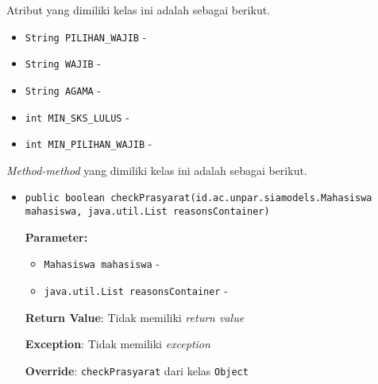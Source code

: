 \documentclass{article}
\begin{document}
\begin{enumerate}
Atribut yang dimiliki kelas ini adalah sebagai berikut.
\begin{itemize}
\item \texttt{String PILIHAN\_WAJIB} - 
\item \texttt{String WAJIB} - 
\item \texttt{String AGAMA} - 
\item \texttt{int MIN\_SKS\_LULUS} - 
\item \texttt{int MIN\_PILIHAN\_WAJIB} - 
\end{itemize}
\textit{Method-method} yang dimiliki kelas ini adalah sebagai berikut.
\begin{itemize}
\item \texttt{public boolean checkPrasyarat(id.ac.unpar.siamodels.Mahasiswa mahasiswa, java.util.List reasonsContainer)}



\textbf{Parameter:}
\begin{itemize}
\item \texttt{Mahasiswa mahasiswa} - 
\item \texttt{java.util.List reasonsContainer} - 
\end{itemize}
\textbf{Return Value}: Tidak memiliki \textit{return value}

\textbf{Exception}: Tidak memiliki \textit{exception}

\textbf{Override}: \texttt{checkPrasyarat} dari kelas \texttt{Object}

\end{itemize}
\end{enumerate}
\end{document}
